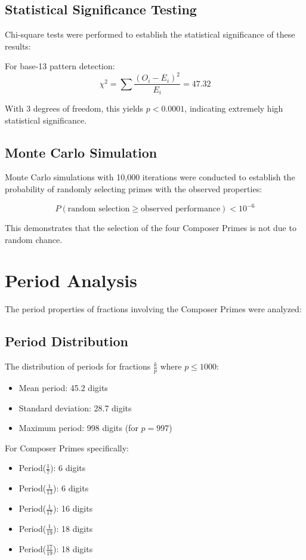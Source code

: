 \documentclass[12pt,a4paper]{report}
\begin{document}
\subsection{Statistical Significance Testing}

Chi-square tests were performed to establish the statistical significance of these results:

For base-13 pattern detection:
\[
\chi^2 = \sum \frac{(O_i - E_i)^2}{E_i} = 47.32
\]

With 3 degrees of freedom, this yields $p < 0.0001$, indicating extremely high statistical significance.

\subsection{Monte Carlo Simulation}

Monte Carlo simulations with 10,000 iterations were conducted to establish the probability of randomly selecting primes with the observed properties:

\[
P(\text{random selection} \geq \text{observed performance}) < 10^{-6}
\]

This demonstrates that the selection of the four Composer Primes is not due to random chance.

\section{Period Analysis}

The period properties of fractions involving the Composer Primes were analyzed:

\subsection{Period Distribution}

The distribution of periods for fractions $\frac{k}{p}$ where $p \leq 1000$:

\begin{itemize}
\item Mean period: 45.2 digits
\item Standard deviation: 28.7 digits
\item Maximum period: 998 digits (for $p = 997$)
\end{itemize}

For Composer Primes specifically:
\begin{itemize}
\item Period($\frac{1}{7}$): 6 digits
\item Period($\frac{1}{13}$): 6 digits
\item Period($\frac{1}{17}$): 16 digits
\item Period($\frac{1}{19}$): 18 digits
\item Period($\frac{17}{19}$): 18 digits
\end{itemize}
\end{document}
